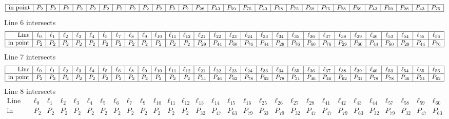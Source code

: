 \documentclass{article}
\begin{document}
{$$\begin{array}{|r*{28}{|c}|}
\hline
\mbox{in point}  & P_{2} & P_{2} & P_{2} & P_{2} & P_{2} & P_{2} & P_{2} & P_{2} & P_{2} & P_{2} & P_{2} & P_{2} & P_{28} & P_{43} & P_{59} & P_{75} & P_{43} & P_{28} & P_{75} & P_{59} & P_{75} & P_{28} & P_{59} & P_{43} & P_{59} & P_{28} & P_{43} & P_{75}\\
\hline
\end{array}
$$
Line 6 intersects 
$$
\begin{array}{|r*{28}{|c}|}
\hline
\mbox{Line}  & \ell_{0} & \ell_{1} & \ell_{2} & \ell_{3} & \ell_{4} & \ell_{5} & \ell_{7} & \ell_{8} & \ell_{9} & \ell_{10} & \ell_{11} & \ell_{12} & \ell_{21} & \ell_{22} & \ell_{23} & \ell_{24} & \ell_{33} & \ell_{34} & \ell_{35} & \ell_{36} & \ell_{37} & \ell_{38} & \ell_{39} & \ell_{40} & \ell_{53} & \ell_{54} & \ell_{55} & \ell_{56}\\
\hline
\mbox{in point}  & P_{2} & P_{2} & P_{2} & P_{2} & P_{2} & P_{2} & P_{2} & P_{2} & P_{2} & P_{2} & P_{2} & P_{2} & P_{29} & P_{44} & P_{60} & P_{76} & P_{44} & P_{29} & P_{76} & P_{60} & P_{76} & P_{29} & P_{60} & P_{44} & P_{60} & P_{29} & P_{44} & P_{76}\\
\hline
\end{array}
$$
Line 7 intersects 
$$
\begin{array}{|r*{28}{|c}|}
\hline
\mbox{Line}  & \ell_{0} & \ell_{1} & \ell_{2} & \ell_{3} & \ell_{4} & \ell_{5} & \ell_{6} & \ell_{8} & \ell_{9} & \ell_{10} & \ell_{11} & \ell_{12} & \ell_{21} & \ell_{22} & \ell_{23} & \ell_{24} & \ell_{33} & \ell_{34} & \ell_{35} & \ell_{36} & \ell_{37} & \ell_{38} & \ell_{39} & \ell_{40} & \ell_{53} & \ell_{54} & \ell_{55} & \ell_{56}\\
\hline
\mbox{in point}  & P_{2} & P_{2} & P_{2} & P_{2} & P_{2} & P_{2} & P_{2} & P_{2} & P_{2} & P_{2} & P_{2} & P_{2} & P_{31} & P_{46} & P_{62} & P_{78} & P_{62} & P_{78} & P_{31} & P_{46} & P_{46} & P_{62} & P_{31} & P_{78} & P_{78} & P_{46} & P_{31} & P_{62}\\
\hline
\end{array}
$$
Line 8 intersects 
$$
\begin{array}{|r*{28}{|c}|}
\hline
\mbox{Line}  & \ell_{0} & \ell_{1} & \ell_{2} & \ell_{3} & \ell_{4} & \ell_{5} & \ell_{6} & \ell_{7} & \ell_{9} & \ell_{10} & \ell_{11} & \ell_{12} & \ell_{13} & \ell_{14} & \ell_{15} & \ell_{16} & \ell_{25} & \ell_{26} & \ell_{27} & \ell_{28} & \ell_{41} & \ell_{42} & \ell_{43} & \ell_{44} & \ell_{57} & \ell_{58} & \ell_{59} & \ell_{60}\\
\hline
\mbox{in point}  & P_{2} & P_{2} & P_{2} & P_{2} & P_{2} & P_{2} & P_{2} & P_{2} & P_{2} & P_{2} & P_{2} & P_{2} & P_{32} & P_{47} & P_{63} & P_{79} & P_{63} & P_{79} & P_{32} & P_{47} & P_{47} & P_{79} & P_{63} & P_{32} & P_{79} & P_{32} & P_{47} & P_{63}\\

\end{array}$$}
\end{document}
